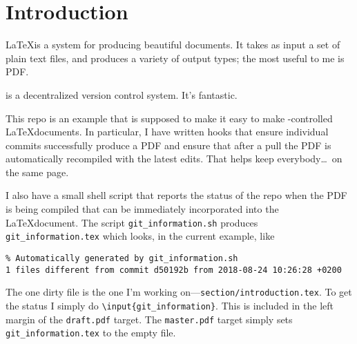 \section{Introduction}

\LaTeX is a system for producing beautiful documents.
It takes as input a set of plain text files, and produces a variety of output types; the most useful to me is PDF.

\git is a decentralized version control system.
It's fantastic.

This repo is an example that is supposed to make it easy to make \git-controlled \LaTeX documents.
In particular, I have written \git hooks that ensure individual commits successfully produce a PDF and ensure that after a pull the PDF is automatically recompiled with the latest edits.
That helps keep everybody\ldots\ on the same page.

I also have a small shell script that reports the status of the repo when the PDF is being compiled that can be immediately incorporated into the \LaTeX document.
The script \texttt{git\_information.sh} produces \texttt{git\_information.tex} which looks, in the current example, like
\begin{verbatim}
% Automatically generated by git_information.sh
1 files different from commit d50192b from 2018-08-24 10:26:28 +0200
\end{verbatim}
The one dirty file is the one I'm working on---\texttt{section/introduction.tex}.
To get the \git status I simply do \texttt{\textbackslash{}input\{git\_information\}}.
This is included in the left margin of the \texttt{draft.pdf} target.  The \texttt{master.pdf} target simply sets \texttt{git\_information.tex} to the empty file.
